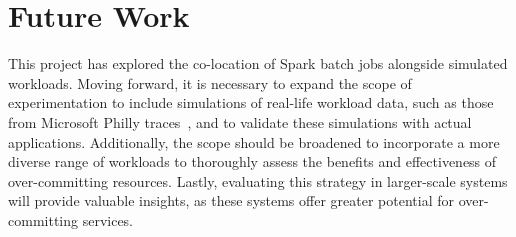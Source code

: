 \section{Future Work}

This project has explored the co-location of Spark batch jobs alongside simulated workloads. Moving forward, it is necessary to expand the scope of experimentation to include simulations of real-life workload data, such as those from Microsoft Philly traces~\cite{jeon_analysis_2019}, and to validate these simulations with actual applications. Additionally, the scope should be broadened to incorporate a more diverse range of workloads to thoroughly assess the benefits and effectiveness of over-committing resources. Lastly, evaluating this strategy in larger-scale systems will provide valuable insights, as these systems offer greater potential for over-committing services.